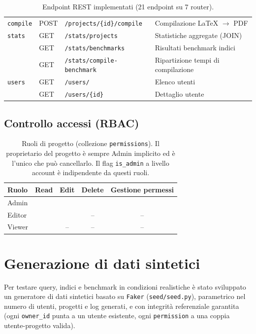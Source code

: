 \documentclass[11pt,a4paper]{article}
\newcommand{\Done}{\textcolor{green!50!black}{\checkmark}}
\begin{document}
\begin{table}[h!]
\begin{tabular}{@{}p{1.9cm}p{1.1cm}p{5.4cm}p{4.4cm}@{}}
\texttt{compile} & POST & \texttt{/projects/\{id\}/compile} & Compilazione LaTeX $\to$ PDF \\
\texttt{stats} & GET & \texttt{/stats/projects} & Statistiche aggregate (JOIN) \\
 & GET & \texttt{/stats/benchmarks} & Risultati benchmark indici \\
 & GET & \texttt{/stats/compile-benchmark} & Ripartizione tempi di compilazione \\
\texttt{users} & GET & \texttt{/users/} & Elenco utenti \\
 & GET & \texttt{/users/\{id\}} & Dettaglio utente \\
\bottomrule
\end{tabular}
\caption{Endpoint REST implementati (21 endpoint su 7 router).}
\end{table}

\subsection{Controllo accessi (RBAC)}

\begin{table}[h!]
\centering
\begin{tabular}{@{}lcccc@{}}
\toprule
\textbf{Ruolo} & \textbf{Read} & \textbf{Edit} & \textbf{Delete} & \textbf{Gestione permessi} \\
\midrule
Admin  & \Done & \Done & \Done & \Done \\
Editor & \Done & \Done & --    & --    \\
Viewer & \Done & --    & --    & --    \\
\bottomrule
\end{tabular}
\caption{Ruoli di progetto (collezione \texttt{permissions}). Il proprietario del progetto è sempre Admin implicito ed è l'unico che può cancellarlo. Il flag \texttt{is\_admin} a livello account è indipendente da questi ruoli.}
\end{table}

\pagebreak

\section{Generazione di dati sintetici}

Per testare query, indici e benchmark in condizioni realistiche è stato sviluppato un generatore di dati sintetici basato su \texttt{Faker} (\texttt{seed/seed.py}), parametrico nel numero di utenti, progetti e log generati, e con integrità referenziale garantita (ogni \texttt{owner\_id} punta a un utente esistente, ogni \texttt{permission} a una coppia utente-progetto valida).
\end{document}
